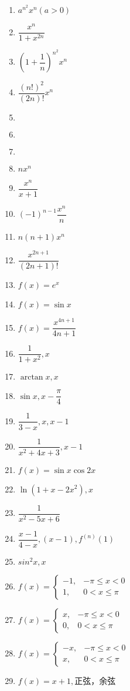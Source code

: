 \documentclass[UTF8,a4paper,12pt,scheme=chinese]{ctexart}
\begin{document}
\begin{Large}
\begin{enumerate}
			\item 	$ a^{n^2}x^n(a>0) $
			\item 	$ \dfrac{x^n}{1+x^{2n}} $
			\item 	$ (1+\dfrac{1}{n})^{n^2}x^n $
			\item	$ \dfrac{(n!)^2}{(2n)!}x^n $
			\item 	$  $
			\item 	$  $
			\item 	$  $
			\item 	$ nx^n $
			\item 	$ \dfrac{x^n}{x+1} $
			\item 	$ (-1)^{n-1}\dfrac{x^n}{n} $
			\item 	$ n(n+1)x^n $
			\item 	$ \dfrac{x^{2n+1}}{(2n+1)!} $
			\item 	$ f(x)=e^x $
			\item 	$ f(x)=\sin x $
			\item 	$ f(x)=\dfrac{x^{4n+1}}{4n+1} $
			\item 	$ \dfrac{1}{1+x^2},x $
			\item 	$ \arctan x,x $
			\item 	$ \sin x,x-\dfrac{\pi}{4} $
			\item 	$ \dfrac{1}{3-x},x,x-1 $
			\item 	$ \dfrac{1}{x^2+4x+3},x-1 $
			\item 	$ f(x)=\sin x \cos 2x $
			\item 	$ \ln(1+x-2x^2),x $
			\item 	$ \dfrac{1}{x^2-5x+6} $
			\item 	$ \dfrac{x-1}{4-x},(x-1),f^{(n)}(1) $
			\item 	$ sin^2x,x $
			\item 	$ f(x)=\left\lbrace \begin{array}{ll}-1,&-\pi\leq x{<}0\\1,&0{<}x\leq\pi\end{array} \right. $
			\item 	$ f(x)=\left\lbrace \begin{array}{ll}x,&-\pi\leq x{<}0\\0,&0{<}x\leq\pi\end{array} \right. $
			\item 	$ f(x)=\left\lbrace \begin{array}{ll}-x,&-\pi\leq x{<}0\\x,&0{<}x\leq\pi\end{array} \right. $
			\item 	$ f(x)=x+1, $正弦，余弦

\end{enumerate}
\end{Large}
\end{document}
